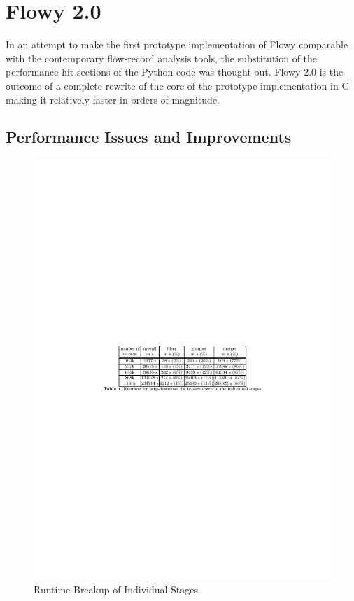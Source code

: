 \chapter{Flowy 2.0}\label{ch:flowy-2}

In an attempt to make the first prototype implementation of Flowy comparable with the contemporary flow-record analysis tools, the substitution of the performance hit sections of the Python code was thought out. Flowy 2.0 \cite{jschauer:thesis:2011} is the outcome of a complete rewrite of the core of the prototype implementation in C making it relatively faster in orders of magnitude. 

\section{Performance Issues and Improvements}\label{sec:performance-issues}
\begin{figure}[h!]
\begin{center}
  \includegraphics* [width=1.0\linewidth]{figures/flowy2-profiling}	
  \caption{Runtime Breakup of Individual Stages \cite{jschauer:thesis:2011}}
  \label{fig:flowy2-profiling}
\end{center}
\end{figure}
